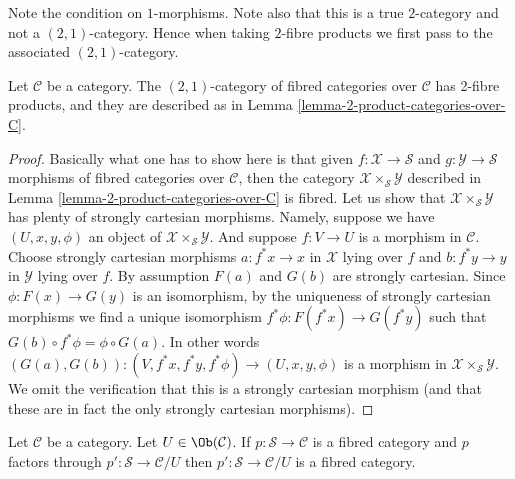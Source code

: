 \noindent
Note the condition on $1$-morphisms.
Note also that this is a true $2$-category and
not a $(2, 1)$-category. Hence when taking $2$-fibre
products we first pass to the associated $(2, 1)$-category.

\begin{lemma}
\label{lemma-2-product-fibred-categories-over-C}
Let $\mathcal{C}$ be a category.
The $(2, 1)$-category of fibred categories
over $\mathcal{C}$ has 2-fibre products, and
they are described as in
Lemma \ref{lemma-2-product-categories-over-C}.
\end{lemma}

\begin{proof}
Basically what one has to show here is that given
$f : \mathcal{X} \to \mathcal{S}$ and
$g : \mathcal{Y} \to \mathcal{S}$ morphisms of fibred
categories over $\mathcal{C}$, then the category
$\mathcal{X} \times_\mathcal{S} \mathcal{Y}$
described in Lemma \ref{lemma-2-product-categories-over-C} is fibred.
Let us show that $\mathcal{X} \times_\mathcal{S} \mathcal{Y}$
has plenty of strongly cartesian morphisms.
Namely, suppose we have $(U, x, y, \phi)$ an object of
$\mathcal{X} \times_\mathcal{S} \mathcal{Y}$.
And suppose $f : V \to U$ is a morphism in $\mathcal{C}$.
Choose strongly cartesian morphisms $a : f^*x \to x$ in $\mathcal{X}$
lying over $f$ and $b : f^*y \to y$ in $\mathcal{Y}$ lying over $f$.
By assumption $F(a)$ and $G(b)$ are strongly cartesian.
Since $\phi : F(x) \to G(y)$ is an isomorphism, by the uniqueness
of strongly cartesian morphisms we find a unique isomorphism
$f^*\phi : F(f^*x) \to G(f^*y)$ such that
$G(b) \circ f^*\phi = \phi \circ G(a)$. In other words
$(G(a), G(b)) : (V, f^*x, f^*y, f^*\phi) \to (U, x, y, \phi)$
is a morphism in $\mathcal{X} \times_\mathcal{S} \mathcal{Y}$.
We omit the verification that this is a strongly cartesian morphism
(and that these are in fact the only strongly cartesian morphisms).
\end{proof}

\begin{lemma}
\label{lemma-cute}
Let $\mathcal{C}$ be a category. Let $U \in \Ob(\mathcal{C})$.
If $p : \mathcal{S} \to \mathcal{C}$ is a fibred category
and $p$ factors through $p' : \mathcal{S} \to \mathcal{C}/U$
then $p' : \mathcal{S} \to \mathcal{C}/U$ is a fibred category.
\end{lemma}

